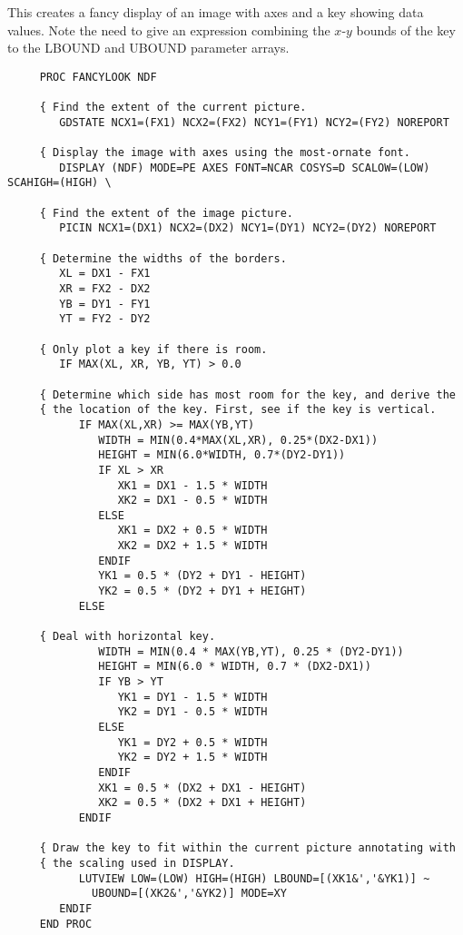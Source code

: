 This creates a fancy display of an image with axes and a key showing data
values.
Note the need to give an expression combining the $x$-$y$ bounds of the key to
the LBOUND and UBOUND parameter arrays.

\begin{small}
\begin{verbatim}
     PROC FANCYLOOK NDF

     { Find the extent of the current picture.
        GDSTATE NCX1=(FX1) NCX2=(FX2) NCY1=(FY1) NCY2=(FY2) NOREPORT

     { Display the image with axes using the most-ornate font.
        DISPLAY (NDF) MODE=PE AXES FONT=NCAR COSYS=D SCALOW=(LOW) SCAHIGH=(HIGH) \

     { Find the extent of the image picture.
        PICIN NCX1=(DX1) NCX2=(DX2) NCY1=(DY1) NCY2=(DY2) NOREPORT

     { Determine the widths of the borders.
        XL = DX1 - FX1
        XR = FX2 - DX2
        YB = DY1 - FY1
        YT = FY2 - DY2

     { Only plot a key if there is room.
        IF MAX(XL, XR, YB, YT) > 0.0

     { Determine which side has most room for the key, and derive the
     { the location of the key. First, see if the key is vertical.
           IF MAX(XL,XR) >= MAX(YB,YT)
              WIDTH = MIN(0.4*MAX(XL,XR), 0.25*(DX2-DX1))
              HEIGHT = MIN(6.0*WIDTH, 0.7*(DY2-DY1))
              IF XL > XR
                 XK1 = DX1 - 1.5 * WIDTH
                 XK2 = DX1 - 0.5 * WIDTH
              ELSE
                 XK1 = DX2 + 0.5 * WIDTH
                 XK2 = DX2 + 1.5 * WIDTH
              ENDIF
              YK1 = 0.5 * (DY2 + DY1 - HEIGHT)
              YK2 = 0.5 * (DY2 + DY1 + HEIGHT)
           ELSE

     { Deal with horizontal key.
              WIDTH = MIN(0.4 * MAX(YB,YT), 0.25 * (DY2-DY1))
              HEIGHT = MIN(6.0 * WIDTH, 0.7 * (DX2-DX1))
              IF YB > YT
                 YK1 = DY1 - 1.5 * WIDTH
                 YK2 = DY1 - 0.5 * WIDTH
              ELSE
                 YK1 = DY2 + 0.5 * WIDTH
                 YK2 = DY2 + 1.5 * WIDTH
              ENDIF
              XK1 = 0.5 * (DX2 + DX1 - HEIGHT)
              XK2 = 0.5 * (DX2 + DX1 + HEIGHT)
           ENDIF

     { Draw the key to fit within the current picture annotating with
     { the scaling used in DISPLAY.
           LUTVIEW LOW=(LOW) HIGH=(HIGH) LBOUND=[(XK1&','&YK1)] ~
             UBOUND=[(XK2&','&YK2)] MODE=XY
        ENDIF
     END PROC
\end{verbatim}
\end{small}
